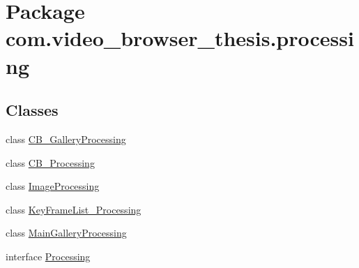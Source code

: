 \hypertarget{namespacecom_1_1video__browser__thesis_1_1processing}{\section{Package com.\-video\-\_\-browser\-\_\-thesis.\-processing}
\label{namespacecom_1_1video__browser__thesis_1_1processing}
}
\subsection*{Classes}
\begin{DoxyCompactItemize}
\item 
class \hyperlink{classcom_1_1video__browser__thesis_1_1processing_1_1_c_b___gallery_processing}{C\-B\-\_\-\-Gallery\-Processing}
\item 
class \hyperlink{classcom_1_1video__browser__thesis_1_1processing_1_1_c_b___processing}{C\-B\-\_\-\-Processing}
\item 
class \hyperlink{classcom_1_1video__browser__thesis_1_1processing_1_1_image_processing}{Image\-Processing}
\item 
class \hyperlink{classcom_1_1video__browser__thesis_1_1processing_1_1_key_frame_list___processing}{Key\-Frame\-List\-\_\-\-Processing}
\item 
class \hyperlink{classcom_1_1video__browser__thesis_1_1processing_1_1_main_gallery_processing}{Main\-Gallery\-Processing}
\item 
interface \hyperlink{interfacecom_1_1video__browser__thesis_1_1processing_1_1_processing}{Processing}
\end{DoxyCompactItemize}
